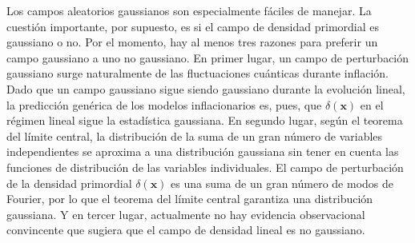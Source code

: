 Los campos aleatorios gaussianos son especialmente fáciles de manejar. La cuestión importante, por supuesto, es si el campo de densidad primordial es gaussiano o no. Por el momento, hay al menos tres razones para preferir un campo gaussiano a uno no gaussiano. En primer lugar, un campo de perturbación gaussiano surge naturalmente de las fluctuaciones cuánticas durante inflación. Dado que un campo gaussiano sigue siendo gaussiano durante la evolución lineal, la predicción genérica de los modelos inflacionarios es, pues, que \(\delta(\symbf{x})\) en el régimen lineal sigue la estadística gaussiana. En segundo lugar, según el teorema del límite central, la distribución de la suma de un gran número de variables independientes se aproxima a una distribución gaussiana sin tener en cuenta las funciones de distribución de las variables individuales. El campo de perturbación de la densidad primordial \(\delta(\symbf{x})\) es una suma de un gran número de modos de Fourier, por lo que el teorema del límite central garantiza una distribución gaussiana. Y en tercer lugar, actualmente no hay evidencia observacional convincente que sugiera que el campo de densidad lineal es no gaussiano.
